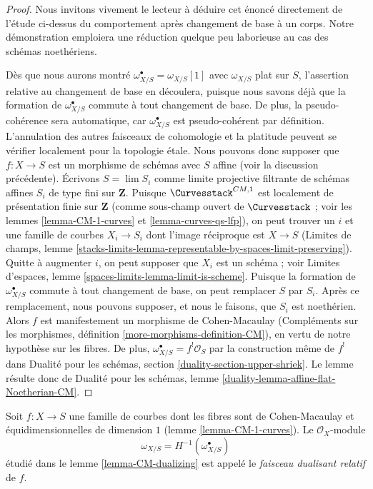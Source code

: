 \begin{proof}
Nous invitons vivement le lecteur à déduire cet énoncé directement de l'étude ci-dessus
du comportement après changement de base à un corps. Notre démonstration
emploiera une réduction quelque peu laborieuse au cas des schémas noethériens.

\medskip\noindent
Dès que nous aurons montré $\omega_{X/S}^\bullet = \omega_{X/S}[1]$ avec
$\omega_{X/S}$ plat sur $S$, l'assertion relative au changement de base
en découlera, puisque nous savons déjà que la formation de $\omega_{X/S}^\bullet$
commute à tout changement de base. De plus, la pseudo-cohérence
sera automatique, car $\omega_{X/S}^\bullet$ est pseudo-cohérent
par définition. L'annulation des autres faisceaux de cohomologie et la platitude
peuvent se vérifier localement pour la topologie étale. Nous pouvons donc supposer que $f : X \to S$
est un morphisme de schémas avec $S$ affine (voir la discussion précédente).
Écrivons $S = \lim S_i$ comme limite projective filtrante de schémas affines $S_i$
de type fini sur $\mathbf{Z}$.
Puisque $\Curvesstack^{CM, 1}$ est localement de présentation finie sur
$\mathbf{Z}$ (comme sous-champ ouvert de $\Curvesstack$ ; voir les
lemmes \ref{lemma-CM-1-curves} et \ref{lemma-curves-qs-lfp}),
on peut trouver un $i$ et une famille
de courbes $X_i \to S_i$ dont l'image réciproque est $X \to S$
(Limites de champs, lemme
\ref{stacks-limits-lemma-representable-by-spaces-limit-preserving}).
Quitte à augmenter $i$, on peut supposer que $X_i$ est un schéma ;
voir Limites d'espaces, lemme \ref{spaces-limits-lemma-limit-is-scheme}.
Puisque la formation de $\omega_{X/S}^\bullet$ commute à
tout changement de base, on peut remplacer $S$ par $S_i$.
Après ce remplacement, nous pouvons supposer, et nous le faisons, que $S_i$ est noethérien.
Alors $f$ est manifestement un morphisme de Cohen-Macaulay
(Compléments sur les morphismes, définition \ref{more-morphisms-definition-CM}),
en vertu de notre hypothèse sur les fibres.
De plus, $\omega_{X/S}^\bullet = f^!\mathcal{O}_S$
par la construction même de $f^!$ dans
Dualité pour les schémas, section \ref{duality-section-upper-shriek}.
Le lemme résulte donc de Dualité pour les schémas, lemme
\ref{duality-lemma-affine-flat-Noetherian-CM}.
\end{proof}

\begin{definition}
\label{definition-relative-dualizing-sheaf}
Soit $f : X \to S$ une famille de courbes dont les fibres sont de Cohen-Macaulay
et équidimensionnelles de dimension $1$ (lemme \ref{lemma-CM-1-curves}).
Le $\mathcal{O}_X$-module
$$
\omega_{X/S} = H^{-1}(\omega_{X/S}^\bullet)
$$
étudié dans le lemme \ref{lemma-CM-dualizing}
est appelé le {\it faisceau dualisant relatif} de $f$.
\end{definition}

